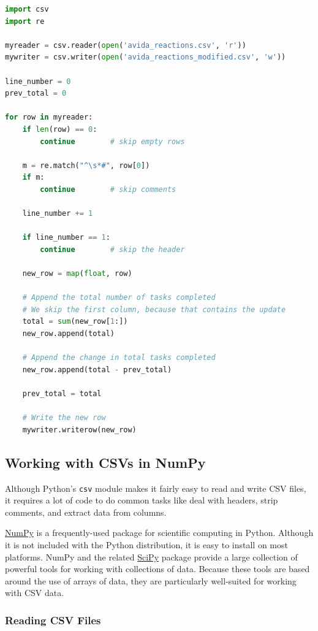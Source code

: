 \begin{lstlisting}[language=Python]
import csv
import re

myreader = csv.reader(open('avida_reactions.csv', 'r'))
mywriter = csv.writer(open('avida_reactions_modified.csv', 'w'))

line_number = 0
prev_total = 0

for row in myreader:
    if len(row) == 0:
        continue        # skip empty rows

    m = re.match("^\s*#", row[0])
    if m:
        continue        # skip comments

    line_number += 1

    if line_number == 1:
        continue        # skip the header

    new_row = map(float, row)

    # Append the total number of tasks completed
    # We skip the first column, because that contains the update
    total = sum(new_row[1:])
    new_row.append(total)

    # Append the change in total tasks completed
    new_row.append(total - prev_total)

    prev_total = total

    # Write the new row
    mywriter.writerow(new_row)
\end{lstlisting}
\subsection{Working with CSVs in NumPy}

Although Python's \lstinline!csv! module makes it fairly easy to read
and write CSV files, it requires a lot of code to do common tasks like
deal with headers, strip comments, and extract data from columns.

\href{http://numpy.scipy.org/}{NumPy} is a frequently-used package for
scientific computing in Python. Although it is not included with the
Python distribution, it is easy to install on most platforms. NumPy and
the related \href{http://www.scipy.org/}{SciPy} package provide a large
collection of powerful tools for working with collections of data.
Because these tools are based around the use of arrays of data, they are
particularly well-suited for working with CSV data.

\subsubsection{Reading CSV Files}

